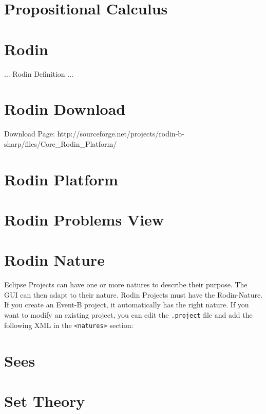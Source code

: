 \section{Propositional Calculus}
\label{propositional_calculus}

\section{Rodin}
\label{rodin}

... Rodin Definition ...

\section{Rodin Download}
\label{rodin_download}

Download Page: http://sourceforge.net/projects/rodin-b-sharp/files/Core\_Rodin\_Platform/


\section{Rodin Platform}
\label{rodin_platform}



\section{Rodin Problems View}
\label{rodin_problems_view}


\section{Rodin Nature}
\label{rodin_nature}

Eclipse Projects can have one or more natures to describe their purpose.  The GUI can then adapt to their nature.  Rodin Projects must have the Rodin-Nature.  If you create an Event-B project, it automatically has the right nature.  If you want to modify an existing project, you can edit the \texttt{.project} file and add the following XML in the \texttt{<natures>} section:


\section{Sees}
\label{sees}

\section{Set Theory}
\label{set_theory}

